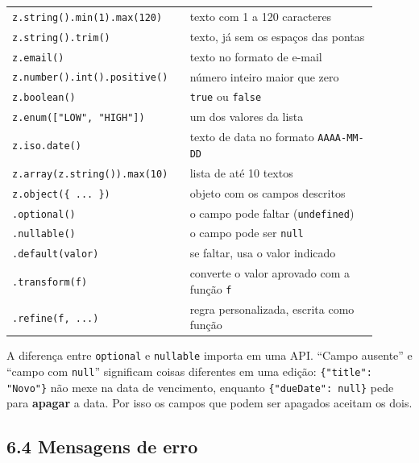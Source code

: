 \begin{center}
\begin{tabular}{@{}P{0.42\linewidth}P{0.48\linewidth}@{}}
\toprule
{}
 &  \\
\midrule
\texttt{z.string().min(1).max(120)} & texto com 1 a 120 caracteres \\
 \texttt{z.string().trim()} & texto, já sem os espaços das pontas \\
\texttt{z.email()} & texto no formato de e-mail \\
 \texttt{z.number().int().positive()} & número inteiro maior que zero \\
\texttt{z.boolean()} & \texttt{true} ou \texttt{false} \\
 \texttt{z.enum(["LOW", "HIGH"])} & um dos valores da lista \\
\texttt{z.iso.date()} & texto de data no formato \texttt{AAAA-MM-DD} \\
 \texttt{z.array(z.string()).max(10)} & lista de até 10 textos \\
\texttt{z.object(\{ ... \})} & objeto com os campos descritos \\
 \texttt{.optional()} & o campo pode faltar (\texttt{undefined}) \\
\texttt{.nullable()} & o campo pode ser \texttt{null} \\
 \texttt{.default(valor)} & se faltar, usa o valor indicado \\
\texttt{.transform(f)} & converte o valor aprovado com a função \texttt{f} \\
 \texttt{.refine(f, ...)} & regra personalizada, escrita como função \\
\bottomrule
\end{tabular}
\end{center}

A diferença entre \texttt{optional} e \texttt{nullable} importa em uma API. ``Campo ausente'' e ``campo com \texttt{null}'' significam coisas diferentes em uma edição: \texttt{\{"title": "Novo"\}} não mexe na data de vencimento, enquanto \texttt{\{"dueDate": null\}} pede para \textbf{apagar} a data. Por isso os campos que podem ser apagados aceitam os dois.

\subsection{6.4 Mensagens de erro}

